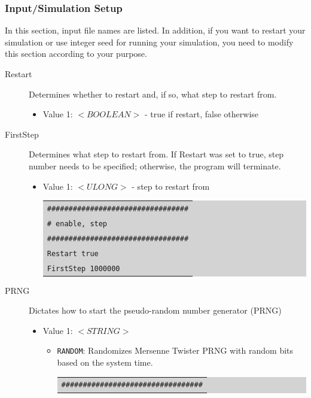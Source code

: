 \subsubsection{Input/Simulation Setup}
In this section, input file names are listed. In addition, if you want to restart your simulation or use integer seed for running your simulation, you need to modify this section according to your purpose.
\begin{description}
\item [Restart] Determines whether to restart and, if so, what step to restart from.\\
	\begin{itemize}
	\item Value 1: $<BOOLEAN>$ - true if restart, false otherwise\\
	\end{itemize}
\item [FirstStep] Determines what step to restart from. If Restart was set to true, step number needs to be specified; otherwise, the program will terminate.\\
	\begin{itemize}
	\item Value 1: $<ULONG>$ - step to restart from\\
	\colorbox{lightgray}{
	\begin{tabular}{l}
	\texttt{\#\#\#\#\#\#\#\#\#\#\#\#\#\#\#\#\#\#\#\#\#\#\#\#\#\#\#\#\#\#\#\#\#}\\
	\texttt{\# enable, step}\\
	\texttt{\#\#\#\#\#\#\#\#\#\#\#\#\#\#\#\#\#\#\#\#\#\#\#\#\#\#\#\#\#\#\#\#\#}\\
	\texttt{Restart     true}\\
	\texttt{FirstStep   1000000}\\
	\end{tabular}}
	\end{itemize}
\item [PRNG] Dictates how to start the pseudo-random number generator (PRNG)
	\begin{itemize}
	\item Value 1: $<STRING>$
		\begin{itemize}
		\item \texttt{RANDOM}: Randomizes Mersenne Twister PRNG with random bits based on the system time.
		\colorbox{lightgray}{
		\begin{tabular}{l}
		\texttt{\#\#\#\#\#\#\#\#\#\#\#\#\#\#\#\#\#\#\#\#\#\#\#\#\#\#\#\#\#\#\#\#\#}\\

\end{tabular}}
\end{itemize}
\end{itemize}
\end{description}
